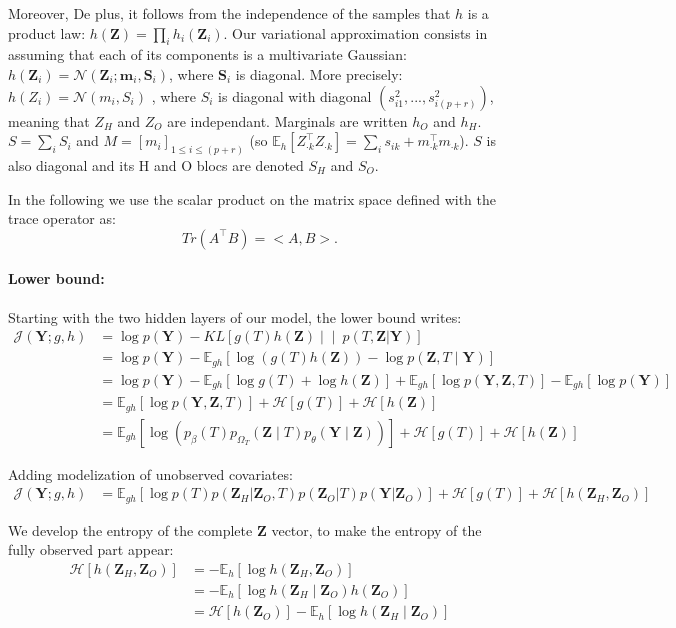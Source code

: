 \documentclass[11pt,a4paper]{article}
\newcommand{\entr}{\mathcal{H}}
\newcommand{\Ybf}{\boldsymbol{Y}}
\newcommand{\Zbf}{\boldsymbol{Z}}
\newcommand{\Sbf}{\boldsymbol{S}}
\newcommand{\mbf}{\boldsymbol{m}}
\newcommand\Ncal{\mathcal{N}}
\newcommand{\Esp}{\mathds{E}}
\begin{document}
Moreover, De plus, it follows from the independence of the samples that $h$ is a product law: $ h(\Zbf) = \prod_i h_i(\Zbf_i)$.
Our variational approximation consists in assuming that each of its components is a multivariate Gaussian: $h(\Zbf_i) = \Ncal(\Zbf_i; \mbf_i, \Sbf_i)$, where $\Sbf_i$ is diagonal. More precisely:  $ h(Z_i) =  \mathcal{N}(m_i,S_i)$ , where $S_i$ is diagonal with diagonal $(s_{i1}^2, ... , s_{i(p+r)}^2)$, meaning that $Z_H$ and $Z_O$ are independant. Marginals are written $h_O$  and  $h_H$. $S=\sum_i S_i$  and $ M =  [m_i]_{1 \leq i \leq (p+r)}$ (so $\Esp_h[Z_{\cdot k}^\intercal Z_{\cdot k}] = \sum_i s_{ik} + m_{\cdot k}^\intercal m_{\cdot k}$). $S$ is also diagonal and its H and O blocs are denoted $S_H$ and $S_O$. 

In the following we use the scalar product on the matrix space defined with the trace operator as: 
$$  Tr(A^\intercal B) = <A,B> .$$
\paragraph{Lower bound:}
Starting with the two hidden layers of our model, the lower bound writes:
\begin{align*}
\mathcal{J}(\Ybf; g,h)&=\log p(\Ybf) - KL\left[g(T) h(\Zbf) \middle\vert\middle\vert\ p(T,\Zbf | \Ybf)\right]\\
&= \log p(\Ybf) - \Esp_{gh}[\log( g(T) h(\Zbf)) - \log p(\Zbf,T\mid \Ybf) ]\\
&= \log p(\Ybf) - \Esp_{gh}[\log g(T) + \log h(\Zbf) ] + \Esp_{gh}[\log p(\Ybf,\Zbf,T)] - \Esp_{gh}[\log p(\Ybf)]\\
&= \Esp_{gh} [\log p(\Ybf,\Zbf,T)] + \entr[g(T)] + \entr[h(\Zbf)]\\
&= \Esp_{gh} [\log (p_\beta(T)p_{\Omega_T}(\Zbf\mid T)p_\theta(\Ybf\mid \Zbf))] + \entr[g(T)] + \entr[h(\Zbf)]
\end{align*}

Adding modelization of unobserved covariates:
\begin{align*}
\mathcal{J}(\Ybf; g,h)&= \Esp_{gh}[\log p(T)  p(\Zbf_H| \Zbf_O,T) p(\Zbf_O|T)p(\Ybf|\Zbf_O)] + \entr[g(T)] +\entr[h(\Zbf_H,\Zbf_O)]
\end{align*}

 We develop the entropy of the complete $\Zbf$ vector, to make the entropy of the fully observed part appear:
\begin{align*}
\entr[h(\Zbf_H,\Zbf_O)] &= -\Esp_h[\log h(\Zbf_H,\Zbf_O)]\\
&=-\Esp_h[\log h(\Zbf_H\mid \Zbf_O) h(\Zbf_O)]\\
&=\entr[h(\Zbf_O)] -\Esp_h[\log h(\Zbf_H\mid \Zbf_O)]
\end{align*}
\end{document}
